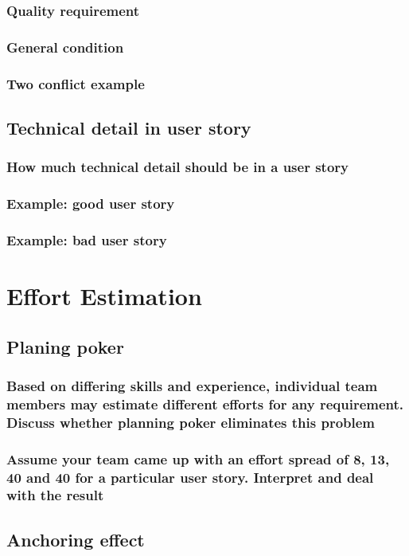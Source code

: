 \documentclass[]{article}
\begin{document}
\subsubsection{Quality requirement}
\subsubsection{General condition}
\subsubsection{Two conflict example}
\subsection{Technical detail in user story}
\subsubsection{How much technical detail should be in a user story}
\subsubsection{Example: good user story}
\subsubsection{Example: bad user story}
\section{Effort Estimation}
\subsection{Planing poker}
\subsubsection{Based on differing skills and experience, individual team members may estimate different efforts for any requirement. Discuss whether planning poker eliminates this problem}
\subsubsection{Assume your team came up with an effort spread of 8, 13, 40 and 40 for a particular user story. Interpret and deal with the result}
\subsection{Anchoring effect}
\end{document}
